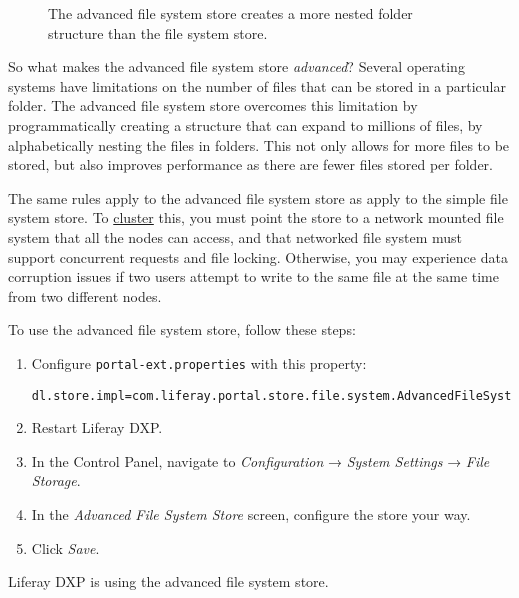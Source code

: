 \begin{figure}
\centering
{}
\caption{The advanced file system store creates a more nested folder
structure than the file system store.}
\end{figure}

So what makes the advanced file system store \emph{advanced}? Several
operating systems have limitations on the number of files that can be
stored in a particular folder. The advanced file system store overcomes
this limitation by programmatically creating a structure that can expand
to millions of files, by alphabetically nesting the files in folders.
This not only allows for more files to be stored, but also improves
performance as there are fewer files stored per folder.

The same rules apply to the advanced file system store as apply to the
simple file system store. To
\href{/docs/7-2/deploy/-/knowledge_base/d/liferay-clustering}{cluster}
this, you must point the store to a network mounted file system that all
the nodes can access, and that networked file system must support
concurrent requests and file locking. Otherwise, you may experience data
corruption issues if two users attempt to write to the same file at the
same time from two different nodes.

To use the advanced file system store, follow these steps:

\begin{enumerate}
\def\labelenumi{\arabic{enumi}.}
\item
  Configure \texttt{portal-ext.properties} with this property:

\begin{verbatim}
dl.store.impl=com.liferay.portal.store.file.system.AdvancedFileSystemStore
\end{verbatim}
\item
  Restart Liferay DXP.
\item
  In the Control Panel, navigate to \emph{Configuration} → \emph{System
  Settings} → \emph{File Storage}.
\item
  In the \emph{Advanced File System Store} screen, configure the store
  your way.
\item
  Click \emph{Save}.
\end{enumerate}

Liferay DXP is using the advanced file system store.

\noindent\hrulefill

